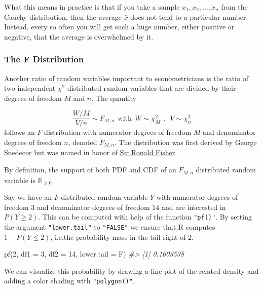 \documentclass[
  14pt,
]{memoir}
\newenvironment{Shaded}{\begin{snugshade}}{\end{snugshade}}
\newcommand{\AttributeTok}[1]{\textcolor[rgb]{0.77,0.63,0.00}{#1}}
\newcommand{\CommentTok}[1]{\textcolor[rgb]{0.56,0.35,0.01}{\textit{#1}}}
\newcommand{\DecValTok}[1]{\textcolor[rgb]{0.00,0.00,0.81}{#1}}
\newcommand{\FunctionTok}[1]{\textcolor[rgb]{0.00,0.00,0.00}{#1}}
\newcommand{\NormalTok}[1]{#1}
\begin{document}
What this means in practice is that if you take a sample \(x_{1}, x_{2}, \ldots, x_{n}\) from the Cauchy distribution, then the average \(\bar{x}\) does not tend to a particular number. Instead, every so often you will get such a huge number, either positive or negative, that the average is overwhelmed by it.

\hypertarget{sec:Fdist}{%
\subsubsection{The F Distribution}\label{sec:Fdist}}

Another ratio of random variables important to econometricians is the ratio of two independent \(\chi^2\) distributed random variables that are divided by their degrees of freedom \(M\) and \(n\). The quantity

\[ \frac{W/M}{V/n} \sim F_{M,n} \ \ \text{with} \ \ W \sim \chi^2_M \ \ , \ \ V \sim \chi^2_n \]
follows an \(F\) distribution with numerator degrees of freedom \(M\) and denominator degrees of freedom \(n\), denoted \(F_{M,n}\). The distribution was first derived by George Snedecor but was named in honor of \href{https://en.wikipedia.org/wiki/Ronald_Fisher}{Sir Ronald Fisher}.

By definition, the support of both PDF and CDF of an \(F_{M,n}\) distributed random variable is \(\mathbb{R}_{\geq0}\).

Say we have an \(F\) distributed random variable \(Y\) with numerator degrees of freedom \(3\) and denominator degrees of freedom \(14\) and are interested in \(P(Y \geq 2)\). This can be computed with help of the function \texttt{"pf()"}. By setting the argument \texttt{"lower.tail"} to \texttt{"FALSE"} we ensure that \textsf{R} computes \(1- P(Y \leq 2)\), i.e,the probability mass in the tail right of \(2\).

\begin{Shaded}
\begin{Highlighting}[]
\FunctionTok{pf}\NormalTok{(}\DecValTok{2}\NormalTok{, }\AttributeTok{df1 =} \DecValTok{3}\NormalTok{, }\AttributeTok{df2 =} \DecValTok{14}\NormalTok{, }\AttributeTok{lower.tail =}\NormalTok{ F)}
\CommentTok{\#\textgreater{} [1] 0.1603538}
\end{Highlighting}
\end{Shaded}

We can visualize this probability by drawing a line plot of the related density and adding a color shading with \texttt{"polygon()"}.
\end{document}
